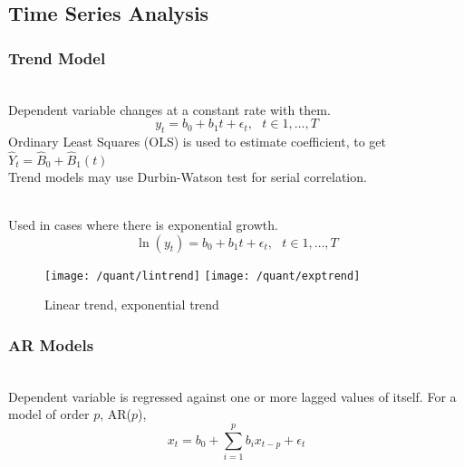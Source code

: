 \subsection{Time Series Analysis}

\subsubsection{Trend Model}

\begin{definition} \\
Dependent variable changes at a constant rate with them.
\begin{equation}
y_t = b_0 + b_1 t + \epsilon_t, \ \ \ t \in {1, \ldots, T} \nonumber
\end{equation}
Ordinary Least Squares (OLS) is used to estimate coefficient, to get $\hat{Y}_t = \hat{B}_0 + \hat{B}_1 (t)$\\
Trend models may use Durbin-Watson test for serial correlation.
\end{definition}

\begin{definition} \\
Used in cases where there is exponential growth.
\begin{equation}
\ln (y_t) = b_0 + b_1 t + \epsilon_t, \ \ \ t \in {1, \ldots, T} \nonumber
\end{equation}
\end{definition}

\begin{figure}[H]
\centering
\texttt{[image: /quant/lintrend]}
\texttt{[image: /quant/exptrend]}
\caption{Linear trend, exponential trend}
\end{figure}

\subsubsection{AR Models}

\begin{definition} \\
Dependent variable is regressed against one or more lagged values of itself. For a model of order $p$, AR($p$),
\begin{equation}
x_t = b_0 + \sum\limits_{i=1}^p b_i x_{t-p} + \epsilon_t \nonumber
\end{equation}
\end{definition}

